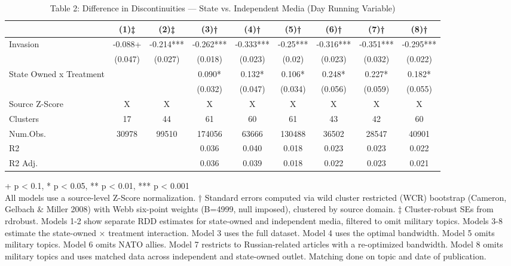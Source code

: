 \begin{table}[!t]
\caption{Table 2: Difference in Discontinuities — State vs. Independent Media (Day Running Variable)} 
\fontsize{12.0pt}{14.4pt}\selectfont
\begin{tabular*}{\linewidth}{@{\extracolsep{\fill}}lcccccccc}
\toprule
  & (1)‡ & (2)‡ & (3)† & (4)† & (5)† & (6)† & (7)† & (8)† \\ 
\midrule\addlinespace[2.5pt]
Invasion & -0.088+ & -0.214*** & -0.262*** & -0.333*** & -0.25*** & -0.316*** & -0.351*** & -0.295*** \\ 
 & (0.047) & (0.027) & (0.018) & (0.023) & (0.02) & (0.023) & (0.032) & (0.022) \\ 
State Owned x Treatment &  &  & 0.090* & 0.132* & 0.106* & 0.248* & 0.227* & 0.182* \\ 
{} & {} & {} & {(0.032)} & {(0.047)} & {(0.034)} & {(0.056)} & {(0.059)} & {(0.055)} \\ 
Source Z-Score & X & X & X & X & X & X & X & X \\ 
Clusters & 17 & 44 & 61 & 60 & 61 & 43 & 42 & 60 \\ 
Num.Obs. & 30978 & 99510 & 174056 & 63666 & 130488 & 36502 & 28547 & 40901 \\ 
R2 &  &  & 0.036 & 0.040 & 0.018 & 0.023 & 0.023 & 0.022 \\ 
R2 Adj. &  &  & 0.036 & 0.039 & 0.018 & 0.022 & 0.023 & 0.021 \\ 
\bottomrule
\end{tabular*}
\begin{minipage}{\linewidth}
+ p < 0.1, * p < 0.05, ** p < 0.01, *** p < 0.001\\
All models use a source-level Z-Score normalization. † Standard errors computed
via wild cluster restricted (WCR) bootstrap (Cameron, Gelbach \& Miller 2008)
with Webb six-point weights (B=4999, null imposed), clustered by source domain.
‡ Cluster-robust SEs from rdrobust. Models 1-2 show separate RDD estimates for
state-owned and independent media, filtered to omit military topics. Models
3-8 estimate the state-owned × treatment interaction. Model 3 uses the full
dataset. Model 4 uses the optimal bandwidth. Model 5 omits military topics.
Model 6 omits NATO allies. Model 7 restricts to Russian-related articles with
a re-optimized bandwidth. Model 8 omits military topics and uses matched data
across independent and state-owned outlet. Matching done on topic and date of
publication.\\
\end{minipage}
\end{table}

